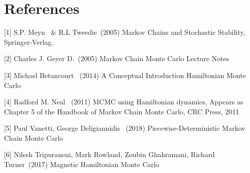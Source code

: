 \documentclass{article}
\begin{document}
\section*{References}


\small

[1] S.P. Meyn \ \& R.L Tweedie\ (2005) Markov Chains and Stochastic Stability, Springer-Verlag.

[2] Charles J. Geyer D.\ (2005) Markov Chain Monte Carlo Lecture Notes

[3] Michael Betancourt \ (2014) A Conceptual Introduction Hamiltonian Monte Carlo 

[4] Radford M. Neal \ (2011) MCMC using Hamiltonian dynamics, Appears as Chapter 5 of the Handbook of Markov Chain Monte Carlo, CRC Press, 2011

[5] Paul Vanetti, George Deligiannidis \ (2018) Piecewise-Deterministic Markov Chain Monte Carlo

[6] Nilesh Tripuraneni, Mark Rowland, Zoubin Ghahramani, Richard Turner\ (2017) Magnetic Hamiltonian Monte Carlo
\end{document}
